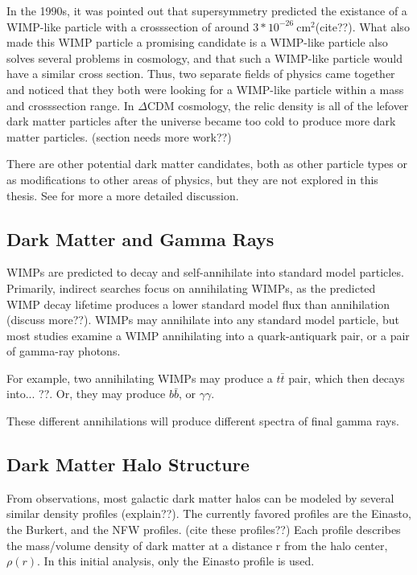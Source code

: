     In the 1990s, it was pointed out that supersymmetry predicted the existance of a WIMP-like particle with a crosssection of around \nicetilde $3*{10}^{-26}\ {\textrm{cm}}^{2}${\color{red}(cite??)}.
    What also made this WIMP particle a promising candidate is a WIMP-like particle also solves several problems in cosmology, and that such a WIMP-like particle would have a similar cross section.
    Thus, two separate fields of physics came together and noticed that they both were looking for a WIMP-like particle within a mass and crosssection range.
    In $\Delta$CDM cosmology, the relic density is all of the lefover dark matter particles after the universe became too cold to produce more dark matter particles.
    {\color{red}(section needs more work??)}

    There are other potential dark matter candidates, both as other particle types or as modifications to other areas of physics, but they are not explored in this thesis.
    See \cite{dm_primer} for more a more detailed discussion.
    
  \subsection{Dark Matter and Gamma Rays}
    WIMPs are predicted to decay and self-annihilate into standard model particles.
    Primarily, indirect searches focus on annihilating WIMPs, as the predicted WIMP decay lifetime produces a lower standard model flux than annihilation {\color{red}(discuss more??)}.
    WIMPs may annihilate into any standard model particle, but most studies examine a WIMP annihilating into a quark-antiquark pair, or a pair of gamma-ray photons.

    For example, two annihilating WIMPs may produce a $t\bar{t}$ pair, which then decays into... {\color{red}??}.
    Or, they may produce $b\bar{b}$, or $\gamma\gamma$.

    These different annihilations will produce different spectra of final gamma rays.
  
  \subsection{Dark Matter Halo Structure}\label{dm_spatial}
    From observations, most galactic dark matter halos can be modeled by several similar density profiles {\color{red}(explain??)}.
    The currently favored profiles are the Einasto, the Burkert, and the NFW profiles. {\color{red}(cite these profiles??)}
    Each profile describes the mass/volume density of dark matter at a distance r from the halo center, $\rho(r)$.
    In this initial analysis, only the Einasto profile is used.

